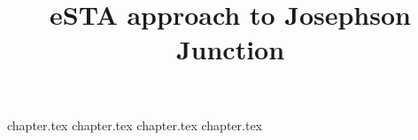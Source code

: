 \documentclass{article}
\title{eSTA approach to Josephson Junction}
\date{}
\author{}
\begin{document}

\maketitle

{chapter.tex}
{chapter.tex}
{chapter.tex}
{chapter.tex}

\end{document}
